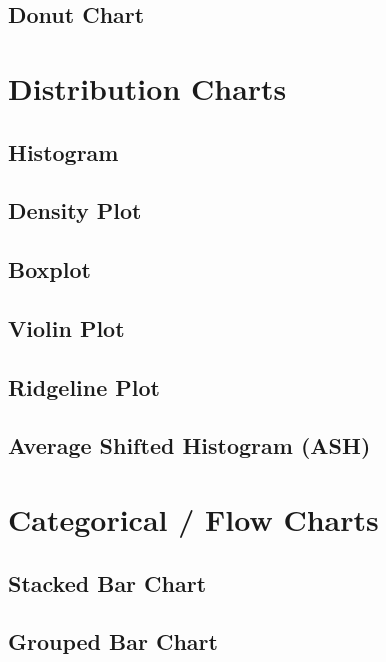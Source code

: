 \documentclass[
  letterpaper,
  DIV=11,
  numbers=noendperiod]{scrreprt}
\begin{document}
\subsection{Donut Chart}\label{donut-chart}

\section{Distribution Charts}\label{distribution-charts}

\subsection{Histogram}\label{histogram-1}

\subsection{Density Plot}\label{density-plot}

\subsection{Boxplot}\label{boxplot-1}

\subsection{Violin Plot}\label{violin-plot}

\subsection{Ridgeline Plot}\label{ridgeline-plot}

\subsection{Average Shifted Histogram
(ASH)}\label{average-shifted-histogram-ash}

\section{Categorical / Flow Charts}\label{categorical-flow-charts}

\subsection{Stacked Bar Chart}\label{stacked-bar-chart}

\subsection{Grouped Bar Chart}\label{grouped-bar-chart}
\end{document}
